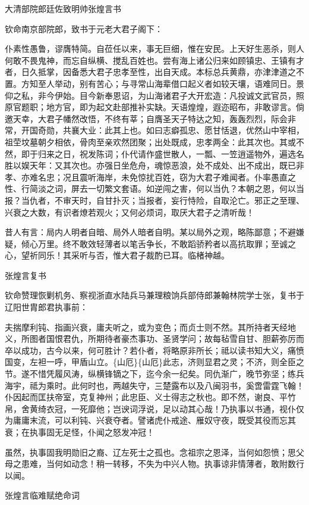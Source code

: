 \documentclass[]{article}
\begin{document}
大清部院郎廷佐致明帅张煌言书

钦命南京部院郎，致书于元老大君子阁下：

仆素性愚鲁，谬膺特简。自莅任以来，事无巨细，惟在安民。上天好生恶杀，则人何敢不畏鬼神，而忘自纵横、搅乱百姓也。尝有海上诸公归来如顾镇忠、王镇有才者，日久抵掌，因备悉大君子忠孝至性，出自天成。本标总兵黄鼎，亦津津道之不置。方知至人举动，别有苦心；与寻常山海辈借口起义者如较天壤，语难同日。景仰之私，非今伊始。目今新奉恩诏，为山海诸君子大开宏造：凡投诚文武官员，照原官题职；地方官，即为起文赴部推补实缺。天语煌煌，遐迩昭布，非敢谬言。倘邀天幸，大君子幡然改悟，不终有莘；自膺圣天子特达之知，轰轰烈烈，际会非常，开国奇勋，共襄大业：此其上也。如曰志癖孤忠、愿甘恬退，优然山中宰相，祖茔坟墓朝夕相依，骨肉至亲欢然团聚；出处既成，忠孝两全：此其次也。其或不然，即于归来之日，祝发陈词；仆代请作盛世散人，一瓢、一笠逍遥物外，遍选名胜以娱天年：又其次也。亦强日坐危舟，魂惊恶浪，处不成处、出不成出，既已非孝、亦难名忠；况且震听海岸，未免惊扰百姓，窃为大君子难闻者。仆率愚直之性、行简淡之词，屏去一切繁文套语。如逆闯之害，何以当仇？本朝之恩，何以当报？当仇者，不审天时，自甘扑灭；当报者，妄行恃险，自取沦亡。邪正之至理、兴衰之大数，有识者燎若观火；又何必烦词，取厌大君子之清听哉！

昔人有言：局内人明者自暗、局外人暗者自明。某以局外之观，略陈鄙意；不避嫌疑，倾心万里。终不敢效轻薄者以笔舌争长，不敢蹈骄矜者以高抗取罪；至诚之心，望祈同乐！其采听与否，惟大君子裁酌已耳。临楮神越。

张煌言复书

钦命赞理恢剿机务、察视浙直水陆兵马兼理粮饷兵部侍郎兼翰林院学士张，复书于辽阳世胄郎君执事前：

夫揣摩利钝、指画兴衰，庸夫听之，或为变色；而贞士则不然。其所持者天经地义，所图者国恨君仇，所期待者豪杰事功、圣贤学问；故每毡雪自甘、胆薪弥厉而卒以成功，古今以来，何可胜计？若仆者，将略原非所长；祗以读书知大义，痛愤国变，左袒一呼，甲盾山立。\{山厄\}\{山厄\}此志，济则显君之灵；不济，则全臣之节。遂不惜凭履风涛，纵横锋镝之下，迄今余一纪矣。同仇渐广，晚节弥坚；练兵海宇，祗为乘时。此何时也，两越失守，三楚露布以及八闽羽书，奚啻雷霆飞翰！仆因起而匡扶帝室，克复神州；此忠臣、义士得志之秋也。即不然，谢良、平竹帛，舍黄绮衣冠，一死靡他；岂谀词浮说，足以动其心哉！乃执事以书通，视仆仅为庸庸末流，可以利钝、兴衰夺者。譬诸虎仆戒途、雁奴守夜，既受其役而忘其衰；在执事固无足怪，仆闻之怒发冲冠！

虽然，执事固我明勋旧之裔、辽左死士之孤也。念祖宗之恩泽，当何如怨愤；思父母之患难，当何如动念！稍一转移，不失为中兴人物。执事谅非情薄者，敢附数行以闻。

张煌言临难赋绝命词
\end{document}
